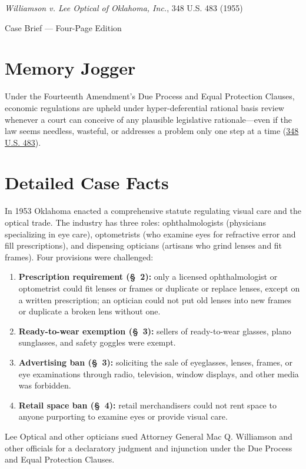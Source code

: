 \documentclass[12pt]{article}
\begin{document}
\begin{center}
{\LARGE \textit{Williamson v. Lee Optical of Oklahoma, Inc.}, 348 U.S. 483 (1955)\par}
\vspace{0.8em}
{\large Case Brief --- Four-Page Edition\par}
\end{center}
\vspace{1em}

\section{Memory Jogger}

Under the Fourteenth Amendment's Due Process and Equal Protection Clauses, economic regulations are upheld under hyper-deferential rational basis review whenever a court can conceive of any plausible legislative rationale---even if the law seems needless, wasteful, or addresses a problem only one step at a time (\href{https://www.courtlistener.com/opinion/105285/williamson-v-lee-optical-of-oklahoma-inc/}{348 U.S. 483}).

\section{Detailed Case Facts}

In 1953 Oklahoma enacted a comprehensive statute regulating visual care and the optical trade. The industry has three roles: ophthalmologists (physicians specializing in eye care), optometrists (who examine eyes for refractive error and fill prescriptions), and dispensing opticians (artisans who grind lenses and fit frames). Four provisions were challenged:
\begin{enumerate}
\item \textbf{Prescription requirement (\S~2):} only a licensed ophthalmologist or optometrist could fit lenses or frames or duplicate or replace lenses, except on a written prescription; an optician could not put old lenses into new frames or duplicate a broken lens without one.
\item \textbf{Ready-to-wear exemption (\S~3):} sellers of ready-to-wear glasses, plano sunglasses, and safety goggles were exempt.
\item \textbf{Advertising ban (\S~3):} soliciting the sale of eyeglasses, lenses, frames, or eye examinations through radio, television, window displays, and other media was forbidden.
\item \textbf{Retail space ban (\S~4):} retail merchandisers could not rent space to anyone purporting to examine eyes or provide visual care.
\end{enumerate}
Lee Optical and other opticians sued Attorney General Mac Q. Williamson and other officials for a declaratory judgment and injunction under the Due Process and Equal Protection Clauses.
\end{document}
